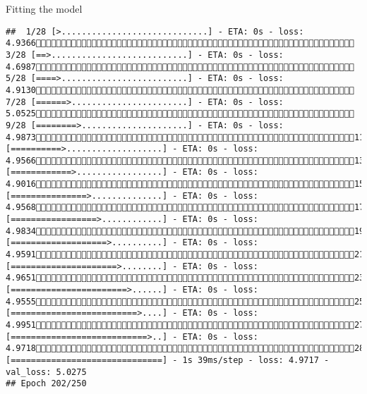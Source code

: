 \documentclass[
  ignorenonframetext,
]{beamer}
\begin{document}
\begin{frame}[fragile]{Fitting the model}
\begin{verbatim}
##  1/28 [>.............................] - ETA: 0s - loss: 4.9366 3/28 [==>...........................] - ETA: 0s - loss: 4.6987 5/28 [====>.........................] - ETA: 0s - loss: 4.9130 7/28 [======>.......................] - ETA: 0s - loss: 5.0525 9/28 [========>.....................] - ETA: 0s - loss: 4.987311/28 [==========>...................] - ETA: 0s - loss: 4.956613/28 [============>.................] - ETA: 0s - loss: 4.901615/28 [===============>..............] - ETA: 0s - loss: 4.956817/28 [=================>............] - ETA: 0s - loss: 4.983419/28 [===================>..........] - ETA: 0s - loss: 4.959121/28 [=====================>........] - ETA: 0s - loss: 4.965123/28 [=======================>......] - ETA: 0s - loss: 4.955525/28 [=========================>....] - ETA: 0s - loss: 4.995127/28 [===========================>..] - ETA: 0s - loss: 4.971828/28 [==============================] - 1s 39ms/step - loss: 4.9717 - val_loss: 5.0275
## Epoch 202/250

\end{verbatim}
\end{frame}
\end{document}
